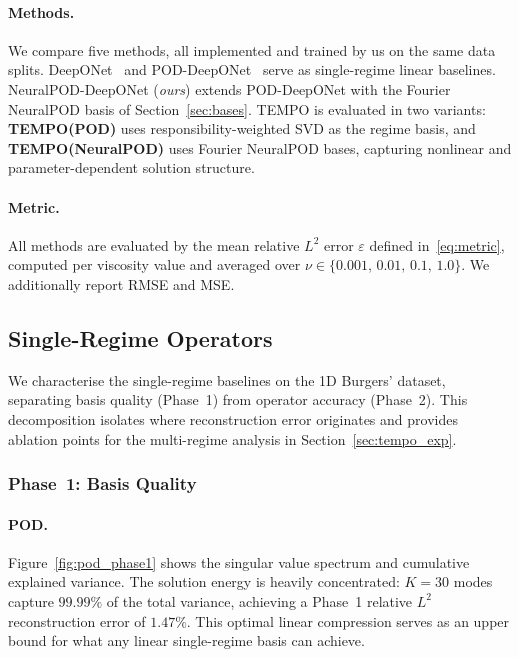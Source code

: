 \documentclass{article}
\begin{document}
\paragraph{Methods.}
We compare five methods, all implemented and trained by us on the same data
splits.
DeepONet~\cite{Lu2019} and POD-DeepONet~\cite{Lu2022} serve as single-regime
linear baselines.
NeuralPOD-DeepONet (\textit{ours}) extends POD-DeepONet with the Fourier
NeuralPOD basis of Section~\ref{sec:bases}.
TEMPO is evaluated in two variants:
\textbf{TEMPO(POD)} uses responsibility-weighted SVD as the regime basis, and
\textbf{TEMPO(NeuralPOD)} uses Fourier NeuralPOD bases, capturing nonlinear
and parameter-dependent solution structure.

\paragraph{Metric.}
All methods are evaluated by the mean relative $L^2$ error $\varepsilon$
defined in~\eqref{eq:metric}, computed per viscosity value and averaged
over $\nu\in\{0.001,\,0.01,\,0.1,\,1.0\}$.
We additionally report RMSE and MSE.

\subsection{Single-Regime Operators}
\label{sec:single_exp}

We characterise the single-regime baselines on the 1D Burgers' dataset,
separating basis quality (Phase~1) from operator accuracy (Phase~2).
This decomposition isolates where reconstruction error originates and
provides ablation points for the multi-regime analysis in
Section~\ref{sec:tempo_exp}.

\subsubsection{Phase~1: Basis Quality}
\label{sec:phase1_exp}

\paragraph{POD.}
Figure~\ref{fig:pod_phase1} shows the singular value spectrum and cumulative
explained variance.
The solution energy is heavily concentrated: $K{=}30$ modes capture $99.99\%$
of the total variance, achieving a Phase~1 relative $L^2$ reconstruction
error of $1.47\%$.
This optimal linear compression serves as an upper bound for what any
linear single-regime basis can achieve.
\end{document}
